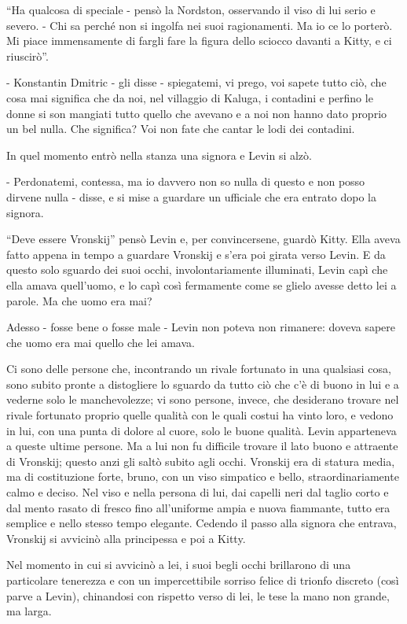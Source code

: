 ``Ha qualcosa di speciale - pensò la Nordston, osservando il viso di lui serio e severo. - Chi sa perché non si ingolfa nei suoi ragionamenti. Ma io ce lo porterò. Mi piace immensamente di fargli fare la figura dello sciocco davanti a Kitty, e ci riuscirò''. 

- Konstantin Dmitric - gli disse - spiegatemi, vi prego, voi sapete tutto ciò, che cosa mai significa che da noi, nel villaggio di Kaluga, i contadini e perfino le donne si son mangiati tutto quello che avevano e a noi non hanno dato proprio un bel nulla. Che significa? Voi non fate che cantar le lodi dei contadini. 

In quel momento entrò nella stanza una signora e Levin si alzò. 

- Perdonatemi, contessa, ma io davvero non so nulla di questo e non posso dirvene nulla - disse, e si mise a guardare un ufficiale che era entrato dopo la signora. 

``Deve essere Vronskij'' pensò Levin e, per convincersene, guardò Kitty. Ella aveva fatto appena in tempo a guardare Vronskij e s'era poi girata verso Levin. E da questo solo sguardo dei suoi occhi, involontariamente illuminati, Levin capì che ella amava quell'uomo, e lo capì così fermamente come se glielo avesse detto lei a parole. Ma che uomo era mai? 

Adesso - fosse bene o fosse male - Levin non poteva non rimanere: doveva sapere che uomo era mai quello che lei amava. 

Ci sono delle persone che, incontrando un rivale fortunato in una qualsiasi cosa, sono subito pronte a distogliere lo sguardo da tutto ciò che c'è di buono in lui e a vederne solo le manchevolezze; vi sono persone, invece, che desiderano trovare nel rivale fortunato proprio quelle qualità con le quali costui ha vinto loro, e vedono in lui, con una punta di dolore al cuore, solo le buone qualità. Levin apparteneva a queste ultime persone. Ma a lui non fu difficile trovare il lato buono e attraente di Vronskij; questo anzi gli saltò subito agli occhi. Vronskij era di statura media, ma di costituzione forte, bruno, con un viso simpatico e bello, straordinariamente calmo e deciso. Nel viso e nella persona di lui, dai capelli neri dal taglio corto e dal mento rasato di fresco fino all'uniforme ampia e nuova fiammante, tutto era semplice e nello stesso tempo elegante. Cedendo il passo alla signora che entrava, Vronskij si avvicinò alla principessa e poi a Kitty. 

Nel momento in cui si avvicinò a lei, i suoi begli occhi brillarono di una particolare tenerezza e con un impercettibile sorriso felice di trionfo discreto (così parve a Levin), chinandosi con rispetto verso di lei, le tese la mano non grande, ma larga. 

